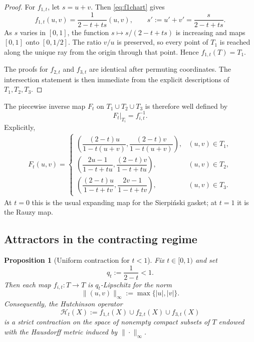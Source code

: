 \documentclass[11pt]{amsart}
\newtheorem{proposition}[proposition]{Proposition}
\theoremstyle{definition}
\newcommand{\HH}{\mathcal{H}}
\begin{document}
\begin{proof}
For $f_{1,t}$, let $s=u+v$. Then \eqref{eq:f1chart} gives
\[
 f_{1,t}(u,v)=\frac{1}{2-t+ts}(u,v),\qquad s' := u'+v' = \frac{s}{2-t+ts}.
\]
As $s$ varies in $[0,1]$, the function $s\mapsto s/(2-t+ts)$ is increasing and maps $[0,1]$ onto $[0,1/2]$. The ratio $v/u$ is preserved, so every point of $T_1$ is reached along the unique ray from the origin through that point. Hence $f_{1,t}(T)=T_1$.

The proofs for $f_{2,t}$ and $f_{3,t}$ are identical after permuting coordinates. The intersection statement is then immediate from the explicit descriptions of $T_1,T_2,T_3$.
\end{proof}

The piecewise inverse map $F_t$ on $T_1\cup T_2\cup T_3$ is therefore well defined by
\[
F_t|_{T_i}=f_{i,t}^{-1}.
\]
Explicitly,
\begin{align*}
F_t(u,v)=
\begin{cases}
\left(\dfrac{(2-t)u}{1-t(u+v)},\dfrac{(2-t)v}{1-t(u+v)}\right),& (u,v)\in T_1,\\[1.1ex]
\left(\dfrac{2u-1}{1-t+tu},\dfrac{(2-t)v}{1-t+tu}\right),& (u,v)\in T_2,\\[1.1ex]
\left(\dfrac{(2-t)u}{1-t+tv},\dfrac{2v-1}{1-t+tv}\right),& (u,v)\in T_3.
\end{cases}
\end{align*}
At $t=0$ this is the usual expanding map for the Sierpi\'nski gasket; at $t=1$ it is the Rauzy map.

\subsection{Attractors in the contracting regime}

\begin{proposition}[Uniform contraction for $t<1$]\label{prop:contraction}
Fix $t\in[0,1)$ and set
\[
q_t:=\frac{1}{2-t}<1.
\]
Then each map $f_{i,t}:T\to T$ is $q_t$-Lipschitz for the norm
\[
\|(u,v)\|_\infty:=\max\{|u|,|v|\}.
\]
Consequently, the Hutchinson operator
\[
\HH_t(X):=f_{1,t}(X)\cup f_{2,t}(X)\cup f_{3,t}(X)
\]
is a strict contraction on the space of nonempty compact subsets of $T$ endowed with the Hausdorff metric induced by $\|\cdot\|_\infty$.
\end{proposition}
\end{document}
